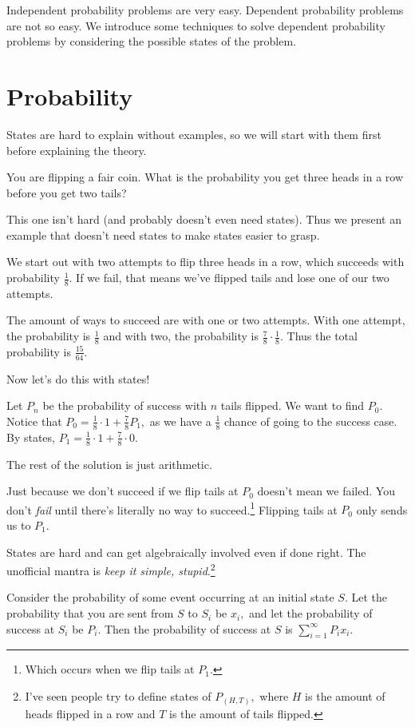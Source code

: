 \documentclass[blue,onecol]{shooting}
\begin{document}
Independent probability problems are very easy. Dependent probability problems are not so easy. We introduce some techniques to solve dependent probability problems by considering the possible states of the problem.

\section{Probability}
States are hard to explain without examples, so we will start with them first before explaining the theory.

\begin{exam}
You are flipping a fair coin. What is the probability you get three heads in a row before you get two tails?
\end{exam}

This one isn't hard (and probably doesn't even need states). Thus we present an example that doesn't need states to make states easier to grasp.

\begin{sol}[1]
We start out with two attempts to flip three heads in a row, which succeeds with probability $\frac{1}{8}.$ If we fail, that means we've flipped tails and lose one of our two attempts.

The amount of ways to succeed are with one or two attempts. With one attempt, the probability is $\frac{1}{8}$ and with two, the probability is $\frac{7}{8}\cdot\frac{1}{8}.$ Thus the total probability is $\frac{15}{64}.$
\end{sol}

Now let's do this with states!

\begin{sol}[2]
Let $P_n$  be the probability of success with $n$ tails flipped. We want to find $P_0.$ Notice that $P_0=\frac{1}{8}\cdot 1+\frac{7}{8}P_1,$ as we have a $\frac{1}{8}$ chance of going to the success case. By states, $P_1=\frac{1}{8}\cdot 1+\frac{7}{8}\cdot 0.$

The rest of the solution is just arithmetic.
\end{sol}
Just because we don't succeed if we flip tails at $P_0$ doesn't mean we failed. You don't \textit{fail} until there's literally no way to succeed.\footnote{Which occurs when we flip tails at $P_1.$} Flipping tails at $P_0$ only sends us to $P_1.$

States are hard and can get algebraically involved even if done right. The unofficial mantra is \textit{keep it simple, stupid}.\footnote{I've seen people try to define states of $P_{(H,T)},$ where $H$ is the amount of heads flipped in a row and $T$ is the amount of tails flipped.}
\begin{theo}
Consider the probability of some event occurring at an initial state $S.$ Let the probability that you are sent from $S$ to $S_i$ be $x_i,$ and let the probability of success at $S_i$ be $P_i.$ Then the probability of success at $S$ is $\sum\limits_{i=1}^{\infty}P_ix_i.$
\end{theo}
\end{document}
